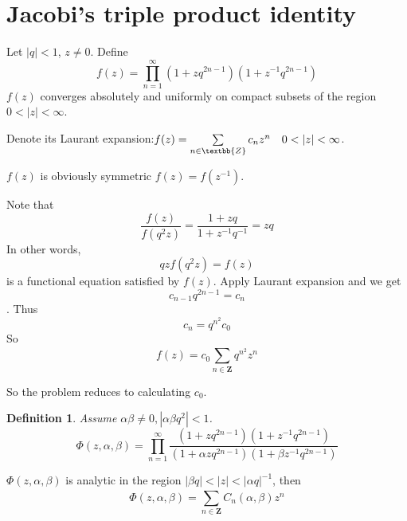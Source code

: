\documentclass{article}
\newtheorem{Def}{Definition}[section]
\begin{document}
\section{Jacobi's triple product identity}
Let $|q|<1$, $z\neq 0$. Define
\begin{equation}
f(z) = \prod_{n=1}^{\infty} (1+zq^{2n-1})(1+z^{-1}q^{2n-1})
\end{equation}
$f(z)$ converges absolutely and uniformly on compact subsets of the region $0<|z|<\infty$.

Denote its Laurant expansion:$f(z) = \sum\limits_{n\in \textbb{Z}}^{} c_nz^n \quad 0<|z|<\infty$.

$f(z)$ is obviously symmetric $f(z)=f(z^{-1})$.

Note that
\begin{equation}
\frac{f(z)}{f(q^2z)} = \frac{1+zq}{1+z^{-1}q^{-1}} = zq
\end{equation}
In other words, \[qz f(q^2z) =f(z)\] is a functional equation satisfied by $f(z)$. Apply Laurant expansion and we get \[c_{n-1}q^{2n-1} = c_n\]. Thus
\begin{equation}
c_n=q^{n^2}c_0
\end{equation}
So
\begin{equation}
f(z)=c_0 \sum\limits_{n\in \bm{Z}}^{}q^{n^2}z^n
\end{equation}

So the problem reduces to calculating $c_0$.

\begin{Def}
 Assume $\alpha\beta\neq 0, |\alpha\beta q^2|<1$.
\begin{equation}
 \Phi(z,\alpha,\beta) =\prod_{n=1}^{\infty} \frac{(1+zq^{2n-1})(1+z^{-1}q^{2n-1})}{(1+\alpha zq^{2n-1})(1+\beta z^{-1}q^{2n-1})}
\end{equation}
\end{Def}

$\Phi(z,\alpha,\beta)$ is analytic in the region $|\beta q|<|z|<|\alpha q|^{-1}$, then
\begin{equation}
\Phi(z,\alpha,\beta) = \sum\limits_{n\in \bm{Z}}^{}  C_n(\alpha,\beta)z^n
\end{equation}
\end{document}
